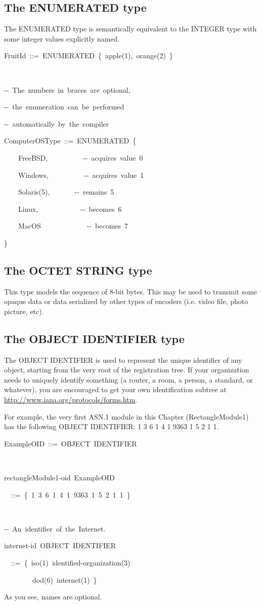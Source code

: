\documentclass[english,oneside,12pt]{book}
\newenvironment{lyxcode}
{\par\begin{list}{}{
\setlength{\rightmargin}{\leftmargin}
\setlength{\listparindent}{0pt}%
\raggedright
\setlength{\itemsep}{0pt}
\setlength{\parsep}{0pt}
\normalfont\ttfamily}%
 \item[]}
{\end{list}}
\begin{document}
\subsection{The ENUMERATED type}

The ENUMERATED type is semantically equivalent to the INTEGER type
with some integer values explicitly named.
\begin{lyxcode}
FruitId~::=~ENUMERATED~\{~apple(1),~orange(2)~\}

~

-{}-~The~numbers~in~braces~are~optional,

-{}-~the~enumeration~can~be~performed

-{}-~automatically~by~the~compiler

ComputerOSType~::=~ENUMERATED~\{

~~~~FreeBSD,~~~~~~~~~~-{}-~acquires~value~0

~~~~Windows,~~~~~~~~~~-{}-~acquires~value~1

~~~~Solaris(5),~~~~~~~-{}-~remains~5

~~~~Linux,~~~~~~~~~~~~-{}-~becomes~6

~~~~MacOS~~~~~~~~~~~~~-{}-~becomes~7

\}
\end{lyxcode}

\subsection{The OCTET STRING type}

This type models the sequence of 8-bit bytes. This may be used to
transmit some opaque data or data serialized by other types of encoders
(i.e. video file, photo picture, etc).


\subsection{The OBJECT IDENTIFIER type}

The OBJECT IDENTIFIER is used to represent the unique identifier of
any object, starting from the very root of the registration tree.
If your organization needs to uniquely identify something (a router,
a room, a person, a standard, or whatever), you are encouraged to
get your own identification subtree at \url{http://www.iana.org/protocols/forms.htm}.

For example, the very first ASN.1 module in this Chapter (RectangleModule1)
has the following OBJECT IDENTIFIER: 1 3 6 1 4 1 9363 1 5 2 1 1.
\begin{lyxcode}
ExampleOID~::=~OBJECT~IDENTIFIER

~

rectangleModule1-oid~ExampleOID

~~::=~\{~1~3~6~1~4~1~9363~1~5~2~1~1~\}

~

-{}-~An~identifier~of~the~Internet.

internet-id~OBJECT~IDENTIFIER

~~::=~\{~iso(1)~identified-organization(3)

~~~~~~~~dod(6)~internet(1)~\}
\end{lyxcode}
As you see, names are optional.
\end{document}
